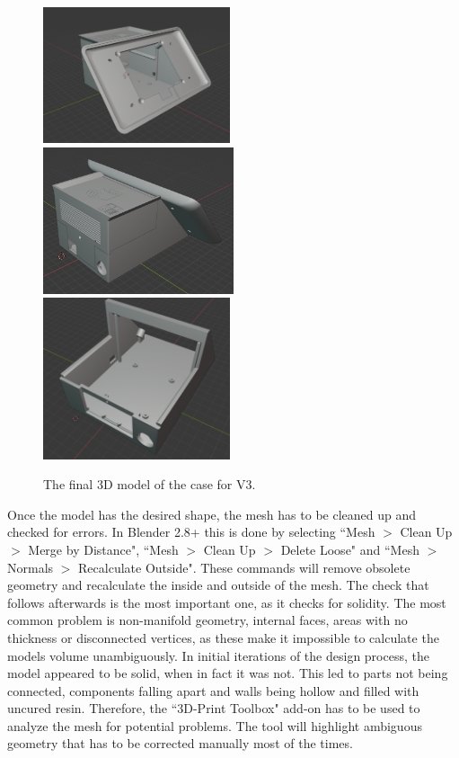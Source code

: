 \documentclass[12pt]{article}
\begin{document}
\begin{figure}[h]
  \centering
  \includegraphics[trim={5cm 1cm 2.5cm 2.4cm},clip,width=0.49\textwidth]{./images/new-front.png}
  \includegraphics[trim={1cm 1cm 1cm 0cm},clip,width=0.5\textwidth]{./images/new-rear.png}
  \includegraphics[width=0.49\textwidth]{./images/new-rear-bottom.png}
  \caption{The final 3D model of the case for V3.}
  \label{fig:new-case}
\end{figure}

Once the model has the desired shape, the mesh has to be cleaned up and checked for errors.
In Blender 2.8+ this is done by selecting ``Mesh $>$ Clean Up $>$ Merge by Distance", ``Mesh $>$ Clean Up $>$ Delete Loose" and ``Mesh $>$ Normals $>$ Recalculate Outside".
These commands will remove obsolete geometry and recalculate the inside and outside of the mesh.
The check that follows afterwards is the most important one, as it checks for solidity.
The most common problem is non-manifold geometry, 
internal faces, areas with no thickness or disconnected vertices,
as these make it impossible to calculate the models volume unambiguously.
In initial iterations of the design process, the model appeared to be solid, when in fact it was not.
This led to parts not being connected, components falling apart and walls being hollow and filled with uncured resin.
Therefore, the ``3D-Print Toolbox" add-on has to be used to analyze the mesh for potential problems.
The tool will highlight ambiguous geometry that has to be corrected manually most of the times.
\end{document}
